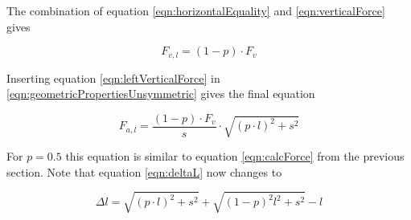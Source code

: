 The combination of equation \ref{eqn:horizontalEquality} and \ref{eqn:verticalForce} gives

\begin{equation}
	F_{v,l} = (1-p)\cdot F_v
	\label{eqn:leftVerticalForce}
\end{equation}

Inserting equation \ref{eqn:leftVerticalForce} in \ref{eqn:geometricPropertiesUnsymmetric} gives the final equation

\begin{equation}
	F_{a,l} = \frac{(1-p)\cdot F_v}{s}\cdot \sqrt{(p\cdot l)^2 + s^2}
\end{equation}

For $p = 0.5$ this equation is similar to equation \ref{eqn:calcForce} from the previous section. Note that equation \ref{eqn:deltaL} now changes to

\begin{equation}
	\Delta l = \sqrt{ (p\cdot l)^2 + s^2 } + \sqrt{ (1-p)^2 l^2 + s^2 } - l
\end{equation}






